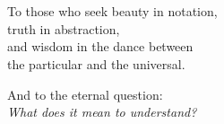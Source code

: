 \chapter*{}
\thispagestyle{empty}

\vspace*{5cm}

\begin{center}
	\itshape
	\large
	
	To those who seek beauty in notation,\\
	truth in abstraction,\\
	and wisdom in the dance between\\
	the particular and the universal.
	
	\vspace{2cm}
	
	And to the eternal question:\\
	\textit{What does it mean to understand?}
\end{center}

\clearpage
